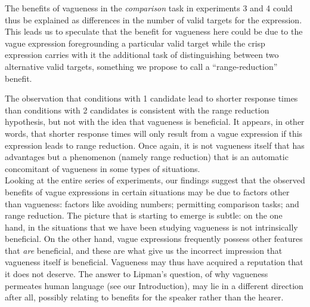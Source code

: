 \documentclass[%
man,		%
floatsintext,%
apacite%
]{apa6}
\begin{document}
The benefits of vagueness in the \emph{comparison} task in experiments 3 and 4 could thus be explained as differences in the number of valid targets for the expression. This leads us to speculate that the benefit for vagueness here could be due to the vague expression foregrounding a particular valid target while the crisp expression carries with it the additional task of distinguishing between two alternative valid targets, something we propose to call a ``range-reduction'' benefit.

The observation that conditions with 1 candidate lead to shorter response times than conditions with 2 candidates is consistent with the range reduction hypothesis, but not with the idea that vagueness is beneficial. It appears, in other words, that shorter response times will only result from a vague expression if this expression leads to range reduction. Once again, it is not vagueness itself that has advantages but a phenomenon (namely range reduction) that is an automatic concomitant of vagueness in some types of situations.\\[2ex]
%
\noindent Looking at the entire series of experiments, our findings suggest that the observed benefits of vague expressions in certain situations may be due to factors other than vagueness: factors like avoiding numbers; permitting comparison tasks; and range reduction. The picture that is starting to emerge is subtle: on the one hand, in the situations that we have been studying 
vagueness is not intrinsically beneficial. On the other hand, vague expressions frequently possess other features that {\em are} beneficial, and these are what give us the incorrect impression that vagueness itself is beneficial. Vagueness may thus have acquired a reputation that it does not deserve. The answer to Lipman's question, of why vagueness permeates human language (see our Introduction), may lie in a different direction after all, possibly relating to benefits for the speaker rather than the hearer. %
\end{document}
